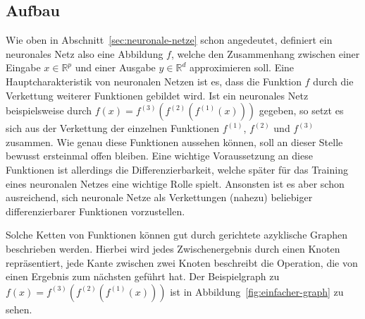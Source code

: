 \subsection{Aufbau}
\label{sec:aufbau}

Wie oben in Abschnitt~\ref{sec:neuronale-netze} schon angedeutet, definiert ein neuronales Netz
also eine Abbildung $f$, welche den Zusammenhang zwischen einer Eingabe $x \in \mathbb{R}^p$
und einer Ausgabe $y \in \mathbb{R}^d$ approximieren soll.
Eine Hauptcharakteristik von neuronalen Netzen ist es, dass die Funktion $f$
durch die Verkettung weiterer Funktionen gebildet wird.
Ist ein neuronales Netz beispielsweise durch
$f(x) = f^{(3)}(f^{(2)}(f^{(1)}(x)))$ gegeben, so setzt es sich aus der
Verkettung der einzelnen Funktionen $f^{(1)}$, $f^{(2)}$ und
$f^{(3)}$ zusammen. Wie genau diese Funktionen aussehen k\"onnen, soll an dieser
Stelle bewusst ersteinmal offen bleiben.
Eine wichtige Voraussetzung an diese Funktionen ist allerdings die
Differenzierbarkeit, welche sp\"ater f\"ur das Training eines neuronalen
Netzes eine wichtige Rolle spielt.
Ansonsten ist es aber schon ausreichend, sich neuronale Netze als
Verkettungen (nahezu) beliebiger differenzierbarer Funktionen vorzustellen.

Solche Ketten von Funktionen k\"onnen gut durch gerichtete
azyklische Graphen beschrieben werden. Hierbei wird jedes Zwischenergebnis
durch einen Knoten repr\"asentiert, jede Kante zwischen zwei Knoten beschreibt
die Operation, die von einen Ergebnis zum n\"achsten gef\"uhrt hat.
Der Beispielgraph zu $f(x) = f^{(3)}(f^{(2)}(f^{(1)}(x)))$ ist in
Abbildung~\ref{fig:einfacher-graph} zu sehen.

